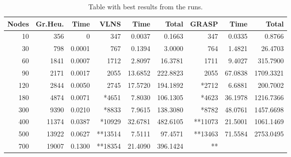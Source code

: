 \documentclass[a4paper]{scrartcl}
\begin{document}
\begin{table}
    \begin{adjustwidth}{-.5in}{-.5in}  
        \begin{center}
\begin{tabular}{r | r | r | r | r | r | r | r | r}
\hline
Nodes & Gr.Heu. & Time &  VLNS & Time & Total & GRASP & Time & Total \\
\hline \hline 
10 & 356 & 0 & 347 & 0.0037 & 0.1663 & 347 & 0.0335 & 0.8766 \\
\hline
30 & 798 & 0.0001 & 767 & 0.1394 & 3.0000 & 764 & 1.4821 & 26.4703 \\
\hline
60 & 1841 & 0.0007 & 1712 & 2.8097 & 16.3781 & 1711 & 9.4027 & 315.7900 \\
\hline
90 & 2171 & 0.0017 & 2055 & 13.6852 & 222.8823 & 2055 & 67.0838 & 1709.3321\\
\hline
120 & 2844 & 0.0050 & 2745 & 17.5720 & 194.1892 & *2712 & 6.6881 & 200.7002 \\
\hline
180 & 4874 & 0.0071 & *4651 & 7.8030 & 106.1305 & *4623 & 36.1978 & 1216.7366 \\
\hline
300 & 9390 & 0.0210 & *8833 & 7.9615 & 138.3080 & *8782 & 48.0761 & 1457.6698 \\
\hline
400 & 11374 & 0.0387 & *10929 & 32.6781 & 482.6105 & **11073 & 21.5001 & 1061.1469 \\
\hline
500 & 13922 & 0.0627 & **13514 & 7.5111 & 97.4571 & **13463 & 71.5584 & 2753.0495 \\
\hline
700 & 19007 & 0.1300 & **18354 & 21.4090 & 396.1424 & ** \\
\hline
\end{tabular}

        \caption{Table with best results from the runs. }
        \label{myTable}
        \end{center}
    \end{adjustwidth}
\end{table}



\end{document}
